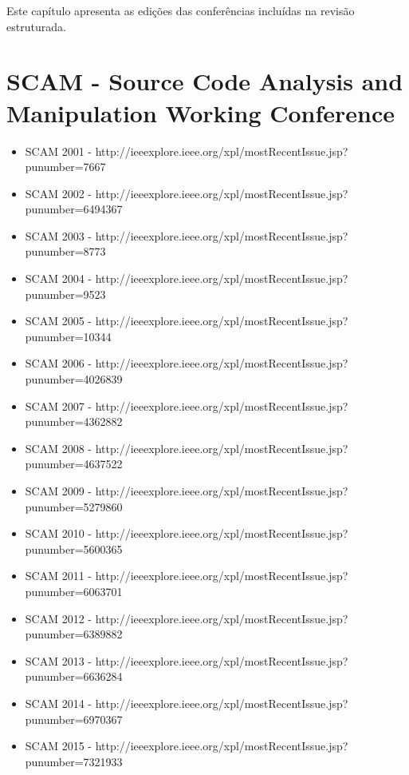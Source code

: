 {Este capítulo apresenta as edições das conferências incluídas na revisão
estruturada.}
\label{edicoes-conferencias}

\section{SCAM - Source Code Analysis and Manipulation Working Conference}

\begin{itemize}
  \item SCAM 2001 - {\small http://ieeexplore.ieee.org/xpl/mostRecentIssue.jsp?punumber=7667}
  \item SCAM 2002 - {\small http://ieeexplore.ieee.org/xpl/mostRecentIssue.jsp?punumber=6494367}
  \item SCAM 2003 - {\small http://ieeexplore.ieee.org/xpl/mostRecentIssue.jsp?punumber=8773}
  \item SCAM 2004 - {\small http://ieeexplore.ieee.org/xpl/mostRecentIssue.jsp?punumber=9523}
  \item SCAM 2005 - {\small http://ieeexplore.ieee.org/xpl/mostRecentIssue.jsp?punumber=10344}
  \item SCAM 2006 - {\small http://ieeexplore.ieee.org/xpl/mostRecentIssue.jsp?punumber=4026839}
  \item SCAM 2007 - {\small http://ieeexplore.ieee.org/xpl/mostRecentIssue.jsp?punumber=4362882}
  \item SCAM 2008 - {\small http://ieeexplore.ieee.org/xpl/mostRecentIssue.jsp?punumber=4637522}
  \item SCAM 2009 - {\small http://ieeexplore.ieee.org/xpl/mostRecentIssue.jsp?punumber=5279860}
  \item SCAM 2010 - {\small http://ieeexplore.ieee.org/xpl/mostRecentIssue.jsp?punumber=5600365}
  \item SCAM 2011 - {\small http://ieeexplore.ieee.org/xpl/mostRecentIssue.jsp?punumber=6063701}
  \item SCAM 2012 - {\small http://ieeexplore.ieee.org/xpl/mostRecentIssue.jsp?punumber=6389882}
  \item SCAM 2013 - {\small http://ieeexplore.ieee.org/xpl/mostRecentIssue.jsp?punumber=6636284}
  \item SCAM 2014 - {\small http://ieeexplore.ieee.org/xpl/mostRecentIssue.jsp?punumber=6970367}
  \item SCAM 2015 - {\small http://ieeexplore.ieee.org/xpl/mostRecentIssue.jsp?punumber=7321933}
\end{itemize}

